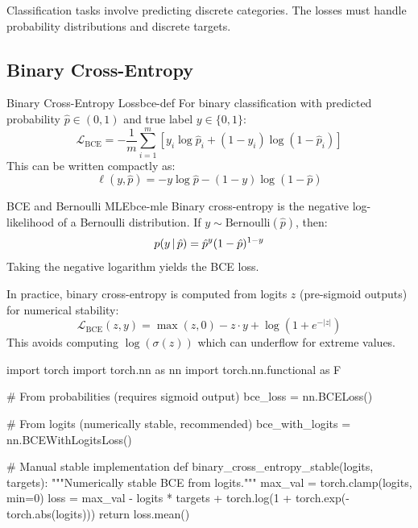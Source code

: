 \documentclass[../../main.tex]{subfiles}
\begin{document}
Classification tasks involve predicting discrete categories. The losses must handle probability distributions and discrete targets.

\subsection{Binary Cross-Entropy}

\begin{definition}{Binary Cross-Entropy Loss}{bce-def}
For binary classification with predicted probability $\hat{p} \in (0, 1)$ and true label $y \in \{0, 1\}$:
\[
    \mathcal{L}_{\text{BCE}} = -\frac{1}{m} \sum_{i=1}^{m} \left[ y_i \log \hat{p}_i + (1 - y_i) \log(1 - \hat{p}_i) \right]
\]
This can be written compactly as:
\[
    \ell(y, \hat{p}) = -y \log \hat{p} - (1-y) \log(1 - \hat{p})
\]
\end{definition}

\begin{theorem}{BCE and Bernoulli MLE}{bce-mle}
Binary cross-entropy is the negative log-likelihood of a Bernoulli distribution. If $y \sim \text{Bernoulli}(\hat{p})$, then:
\[
    p(y \,|\, \hat{p}) = \hat{p}^y (1 - \hat{p})^{1-y}
\]
Taking the negative logarithm yields the BCE loss.
\end{theorem}

\begin{important}
In practice, binary cross-entropy is computed from logits $z$ (pre-sigmoid outputs) for numerical stability:
\[
    \mathcal{L}_{\text{BCE}}(z, y) = \max(z, 0) - z \cdot y + \log(1 + e^{-|z|})
\]
This avoids computing $\log(\sigma(z))$ which can underflow for extreme values.
\end{important}

\begin{pythoncode}
import torch
import torch.nn as nn
import torch.nn.functional as F

# From probabilities (requires sigmoid output)
bce_loss = nn.BCELoss()

# From logits (numerically stable, recommended)
bce_with_logits = nn.BCEWithLogitsLoss()

# Manual stable implementation
def binary_cross_entropy_stable(logits, targets):
    """Numerically stable BCE from logits."""
    max_val = torch.clamp(logits, min=0)
    loss = max_val - logits * targets + torch.log(1 + torch.exp(-torch.abs(logits)))
    return loss.mean()
\end{pythoncode}
\end{document}

